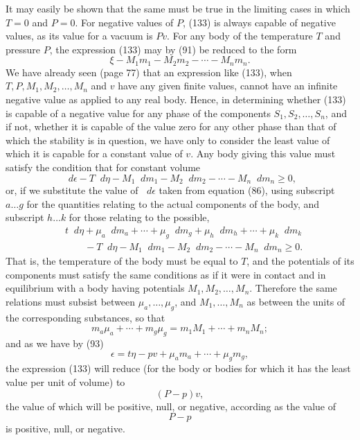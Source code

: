 \documentclass[11pt]{article}
\newcommand{\dd}{\mathop{}\!d}
\newcommand{\eps}{\epsilon}
\begin{document}
It may easily be shown that the same must be true in the limiting cases in which \(T=0\) and \(P=0\). For negative values of \(P\), (133) is always capable of negative values, as its value for a vacuum is \(Pv\). For any body of the temperature \(T\) and pressure \(P\), the expression (133) may by (91) be reduced to the form
\begin{equation}
\xi-M_1m_1-M_2m_2-\cdots-M_nm_n.
\end{equation}
We have already seen (page 77) that an expression like (133), when \(T,P,M_1,M_2,\ldots,M_n\) and \(v\) have any given finite values, cannot have an infinite negative value as applied to any real body. Hence, in determining whether (133) is capable of a negative value for any phase of the components \(S_1,S_2,\ldots,S_n\), and if not, whether it is capable of the value zero for any other phase than that of which the stability is in question, we have only to consider the least value of which it is capable for a constant value of \(v\). Any body giving this value must satisfy the condition that for constant volume
\begin{equation}
\dd\eps-T\dd\eta-M_1\dd m_1-M_2\dd m_2-\cdots-M_n\dd m_n\geq0,
\end{equation}
or, if we substitute the value of \(\dd\eps\) taken from equation (86), using subscript \(a\ldots g\) for the quantities relating to the actual components of the body, and subscript \(h\ldots k\) for those relating to the possible,
\begin{equation}
\begin{aligned}
&t\dd\eta+\mu_a\dd m_a+\cdots+\mu_g\dd m_g+\mu_h\dd m_h+\cdots+\mu_k\dd m_k\\
&\qquad{}-T\dd\eta-M_1\dd m_1-M_2\dd m_2-\cdots-M_n\dd m_n\geq0.
\end{aligned}
\end{equation}
That is, the temperature of the body must be equal to \(T\), and the potentials of its components must satisfy the same conditions as if it were in contact and in equilibrium with a body having potentials \(M_1,M_2,\ldots,M_n\). Therefore the same relations must subsist between \(\mu_a,\ldots,\mu_g\), and \(M_1,\ldots,M_n\) as between the units of the corresponding substances, so that
\begin{equation}
m_a\mu_a+\cdots+m_g\mu_g=m_1M_1+\cdots+m_nM_n;
\end{equation}
and as we have by (93)
\begin{equation}
\eps=t\eta-pv+\mu_am_a+\cdots+\mu_gm_g,
\end{equation}
the expression (133) will reduce (for the body or bodies for which it has the least value per unit of volume) to
\begin{equation}
(P-p)v,
\end{equation}
the value of which will be positive, null, or negative, according as the value of
\begin{equation}
P-p
\end{equation}
is positive, null, or negative.
\end{document}
